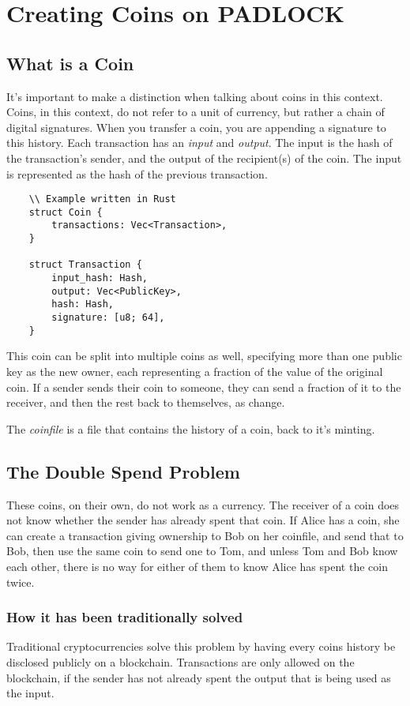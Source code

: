 \documentclass[12pt, letterpaper]{article}
\begin{document}
\section{Creating Coins on PADLOCK}

\subsection{What is a Coin}
It's important to make a distinction when talking about coins in this context.
Coins, in this context, do not refer to a unit of currency, but rather a chain
of digital signatures. When you transfer a coin, you are appending a signature
to this history. Each transaction has an \textit{input} and \textit{output}. The
input is the hash of the transaction's sender, and the output of the recipient(s) of the coin. 
The input is represented as the hash of the previous transaction.

\begin{verbatim}
    \\ Example written in Rust
    struct Coin {
        transactions: Vec<Transaction>,
    }
    
    struct Transaction {
        input_hash: Hash,
        output: Vec<PublicKey>,
        hash: Hash,
        signature: [u8; 64],
    }
\end{verbatim}

This coin can be split into multiple coins as well, specifying more than one
public key as the new owner, each representing a fraction of the value of the
original coin. If a sender sends their coin to someone, they can send a fraction
of it to the receiver, and then the rest back to themselves, as change.

The \textit{coinfile} is a file that contains the history of a coin, back to
it's minting.


\subsection{The Double Spend Problem}
These coins, on their own, do not work as a currency. The receiver of a coin
does not know whether the sender has already spent that coin. If Alice has a
coin, she can create a transaction giving ownership to Bob on her coinfile, and
send that to Bob, then use the same coin to send one to Tom, and unless Tom and
Bob know each other, there is no way for either of them to know Alice has spent
the coin twice.

\subsubsection{How it has been traditionally solved}
Traditional cryptocurrencies solve this problem by having every coins history be
disclosed publicly on a blockchain. Transactions are only allowed on the
blockchain, if the sender has not already spent the output that is being used as
the input.
\end{document}
